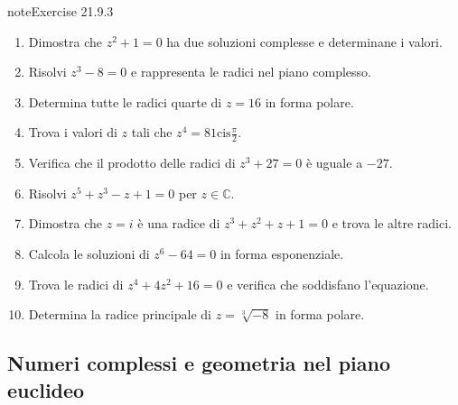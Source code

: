 \documentclass[letterpaper,10pt,italian]{jupyterBook}
\begin{document}
\begin{sphinxadmonition}{note}{Exercise 21.9.3}


\begin{enumerate}
%
\item {} 
\sphinxAtStartPar
Dimostra che \(z^2 + 1 = 0\) ha due soluzioni complesse e determinane i valori.

\item {} 
\sphinxAtStartPar
Risolvi \(z^3 - 8 = 0\) e rappresenta le radici nel piano complesso.

\item {} 
\sphinxAtStartPar
Determina tutte le radici quarte di \(z = 16\) in forma polare.

\item {} 
\sphinxAtStartPar
Trova i valori di \(z\) tali che \(z^4 = 81 \text{cis}\frac{\pi}{2}\).

\item {} 
\sphinxAtStartPar
Verifica che il prodotto delle radici di \(z^3 + 27 = 0\) è uguale a \(-27\).

\item {} 
\sphinxAtStartPar
Risolvi \(z^5 + z^3 - z + 1 = 0\) per \(z \in \mathbb{C}\).

\item {} 
\sphinxAtStartPar
Dimostra che \(z = i\) è una radice di \(z^3 + z^2 + z + 1 = 0\) e trova le altre radici.

\item {} 
\sphinxAtStartPar
Calcola le soluzioni di \(z^6 - 64 = 0\) in forma esponenziale.

\item {} 
\sphinxAtStartPar
Trova le radici di \(z^4 + 4z^2 + 16 = 0\) e verifica che soddisfano l’equazione.

\item {} 
\sphinxAtStartPar
Determina la radice principale di \(z = \sqrt[3]{-8}\) in forma polare.

\end{enumerate}
\end{sphinxadmonition}


\subsection{Numeri complessi e geometria nel piano euclideo}
\label{\detokenize{ch/algebra/complex-algebra-problems:numeri-complessi-e-geometria-nel-piano-euclideo}}\label{\detokenize{ch/algebra/complex-algebra-problems:math-hs-algebra-complex-problems-geometry-2d}} \label{exercise:math-hs:algebra:complex:problems:geometry-2d:ex}
\end{document}
